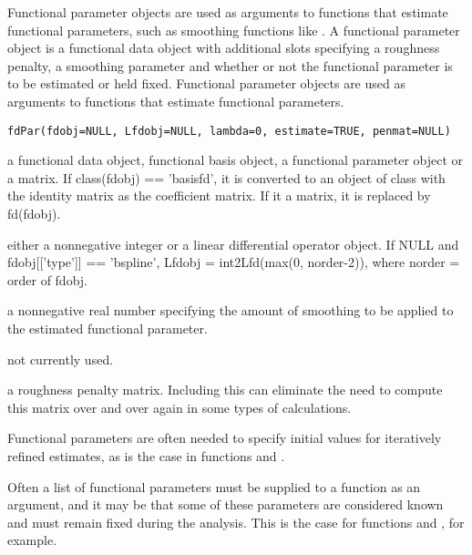 \documentclass{article}
\begin{document}
\begin{Description}\relax
Functional parameter objects are used as arguments to functions that
estimate functional parameters, such as smoothing functions like
.  A functional parameter object is a functional
data object with additional slots specifying a roughness penalty, a
smoothing parameter and whether or not the functional parameter is to
be estimated or held fixed.  Functional parameter objects are used as
arguments to functions that estimate functional parameters.
\end{Description}
\begin{Usage}
\begin{verbatim}
fdPar(fdobj=NULL, Lfdobj=NULL, lambda=0, estimate=TRUE, penmat=NULL)
\end{verbatim}
\end{Usage}
\begin{Arguments}
\begin{ldescription}
\item[\code{fdobj}] a functional data object, functional basis object, a functional
parameter object or a matrix.  If class(fdobj) == 'basisfd', it is
converted to an object of class  with the identity matrix
as the coefficient matrix.  If it a matrix, it is replaced by
fd(fdobj).

\item[\code{Lfdobj}] either a nonnegative integer or a linear differential operator
object.  If NULL and fdobj[['type']] == 'bspline', Lfdobj =
int2Lfd(max(0, norder-2)), where norder = order of fdobj.

\item[\code{lambda}] a nonnegative real number specifying the amount of smoothing
to be applied to the estimated functional parameter.

\item[\code{estimate}] not currently used.
\item[\code{penmat}] a roughness penalty matrix.  Including this can eliminate the need
to compute this matrix over and over again in some types of
calculations.

\end{ldescription}
\end{Arguments}
\begin{Details}\relax
Functional parameters are often needed to specify initial
values for iteratively refined estimates, as is the case in
functions  and .

Often a list of functional parameters must be supplied to a function
as an argument, and it may be that some of these parameters are
considered known and must remain fixed during the analysis.  This is
the case for functions  and  , for
example.
\end{Details}
\end{document}
